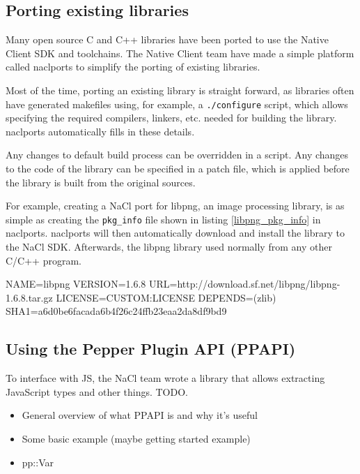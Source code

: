 
\subsection{Porting existing libraries} %
\label{sub:naclports}
Many open source C and C++ libraries have been ported to use the Native Client SDK and toolchains. The Native Client team have made a simple platform called naclports to simplify the porting of existing libraries. 

Most of the time, porting an existing library is straight forward, as libraries often have generated makefiles using, for example, a \lstinline+./configure+ script, which allows specifying the required compilers, linkers, etc. needed for building the library. naclports automatically fills in these details. 

Any changes to default build process can be overridden in a script. Any changes to the code of the library can be specified in a patch file, which is applied before the library is built from the original sources.

For example, creating a NaCl port for libpng, an image processing library, is as simple as creating the \lstinline+pkg_info+ file shown in listing \ref{libpng_pkg_info} in naclports. naclports will then automatically download and install the library to the NaCl SDK. Afterwards, the libpng library used normally from any other C/C++ program.

\begin{code}
NAME=libpng
VERSION=1.6.8
URL=http://download.sf.net/libpng/libpng-1.6.8.tar.gz
LICENSE=CUSTOM:LICENSE
DEPENDS=(zlib)
SHA1=a6d0be6facada6b4f26c24ffb23eaa2da8df9bd9
\end{code}


\subsection{Using the Pepper Plugin API (PPAPI)} %
\label{sub:using_PPAPI}
To interface with JS, the NaCl team wrote a library that allows extracting JavaScript types and other things. TODO.

\begin{itemize}
	\item General overview of what PPAPI is and why it's useful
	\item Some basic example (maybe getting started example)
	\item pp::Var
\end{itemize}


